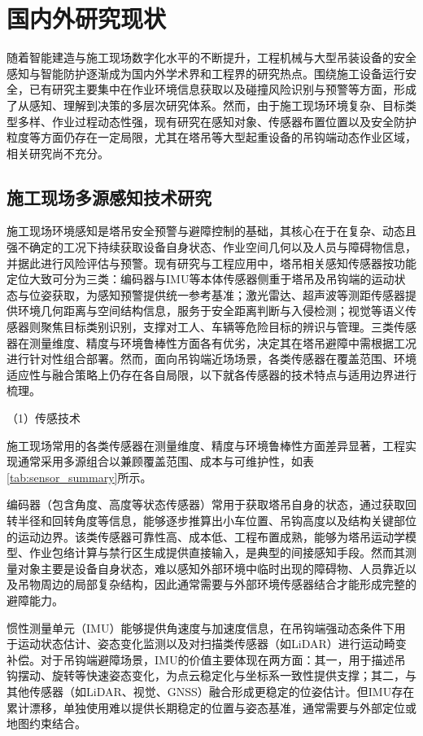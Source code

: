 \section{国内外研究现状}\label{ux56fdux5185ux5916ux7814ux7a76ux73b0ux72b6}

随着智能建造与施工现场数字化水平的不断提升，工程机械与大型吊装设备的安全感知与智能防护逐渐成为国内外学术界和工程界的研究热点。围绕施工设备运行安全，已有研究主要集中在作业环境信息获取以及碰撞风险识别与预警等方面，形成了从感知、理解到决策的多层次研究体系。然而，由于施工现场环境复杂、目标类型多样、作业过程动态性强，现有研究在感知对象、传感器布置位置以及安全防护粒度等方面仍存在一定局限，尤其在塔吊等大型起重设备的吊钩端动态作业区域，相关研究尚不充分。

\subsection{施工现场多源感知技术研究}\label{ux65bdux5de5ux73b0ux573aux73afux5883ux611fux77e5ux7814ux7a76}

施工现场环境感知是塔吊安全预警与避障控制的基础，其核心在于在复杂、动态且强不确定的工况下持续获取设备自身状态、作业空间几何以及人员与障碍物信息，并据此进行风险评估与预警。现有研究与工程应用中，塔吊相关感知传感器按功能定位大致可分为三类：编码器与IMU等本体传感器侧重于塔吊及吊钩端的运动状态与位姿获取，为感知预警提供统一参考基准；激光雷达、超声波等测距传感器提供环境几何距离与空间结构信息，服务于安全距离判断与入侵检测；视觉等语义传感器则聚焦目标类别识别，支撑对工人、车辆等危险目标的辨识与管理。三类传感器在测量维度、精度与环境鲁棒性方面各有优劣，决定其在塔吊避障中需根据工况进行针对性组合部署。然而，面向吊钩端近场场景，各类传感器在覆盖范围、环境适应性与融合策略上仍存在各自局限，以下就各传感器的技术特点与适用边界进行梳理。

（1）传感技术

施工现场常用的各类传感器在测量维度、精度与环境鲁棒性方面差异显著，工程实现通常采用多源组合以兼顾覆盖范围、成本与可维护性，如表\ref{tab:sensor_summary}所示。

编码器（包含角度、高度等状态传感器）常用于获取塔吊自身的状态，通过获取回转半径和回转角度等信息，能够逐步推算出小车位置、吊钩高度以及结构关键部位的运动边界。该类传感器可靠性高、成本低、工程布置成熟，能够为塔吊运动学模型、作业包络计算与禁行区生成提供直接输入，是典型的间接感知手段。然而其测量对象主要是设备自身状态，难以感知外部环境中临时出现的障碍物、人员靠近以及吊物周边的局部复杂结构，因此通常需要与外部环境传感器结合才能形成完整的避障能力。

惯性测量单元（IMU）能够提供角速度与加速度信息，在吊钩端强动态条件下用于运动状态估计、姿态变化监测以及对扫描类传感器（如LiDAR）进行运动畸变补偿。对于吊钩端避障场景，IMU的价值主要体现在两方面：其一，用于描述吊钩摆动、旋转等快速姿态变化，为点云稳定化与坐标系一致性提供支撑；其二，与其他传感器（如LiDAR、视觉、GNSS）融合形成更稳定的位姿估计。但IMU存在累计漂移，单独使用难以提供长期稳定的位置与姿态基准，通常需要与外部定位或地图约束结合。

